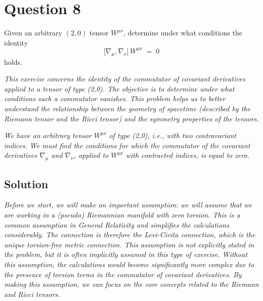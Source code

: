\section*{Question 8}

Given an arbitrary $(2,0)$ tensor $W^{\mu\nu}$, determine under what conditions the identity
\[
\bigl[\nabla_{\mu}, \nabla_{\nu}\bigr] \,W^{\mu\nu} \;=\; 0
\]
holds.

\textit{This exercise concerns the identity of the commutator of covariant derivatives applied to a tensor of type (2,0). The objective is to determine under what conditions such a commutator vanishes. This problem helps us to better understand the relationship between the geometry of spacetime (described by the Riemann tensor and the Ricci tensor) and the symmetry properties of the tensors.}

\textit{We have an arbitrary tensor \(W^{\mu\nu}\) of type (2,0), i.e., with two contravariant indices. We must find the conditions for which the commutator of the covariant derivatives \(\nabla_{\mu}\) and \(\nabla_{\nu}\), applied to \(W^{\mu\nu}\) with contracted indices, is equal to zero. }

\subsection*{Solution}

\textit{Before we start, we will make an important assumption: we will assume that we are working in a (pseudo) Riemannian manifold with zero torsion. This is a common assumption in General Relativity and simplifies the calculations considerably. The connection is therefore the Levi-Civita connection, which is the unique torsion-free metric connection.  This assumption is not explicitly stated in the problem, but it is often implicitly assumed in this type of exercise. Without this assumption, the calculations would become significantly more complex due to the presence of torsion terms in the commutator of covariant derivatives.  By making this assumption, we can focus on the core concepts related to the Riemann and Ricci tensors.}

